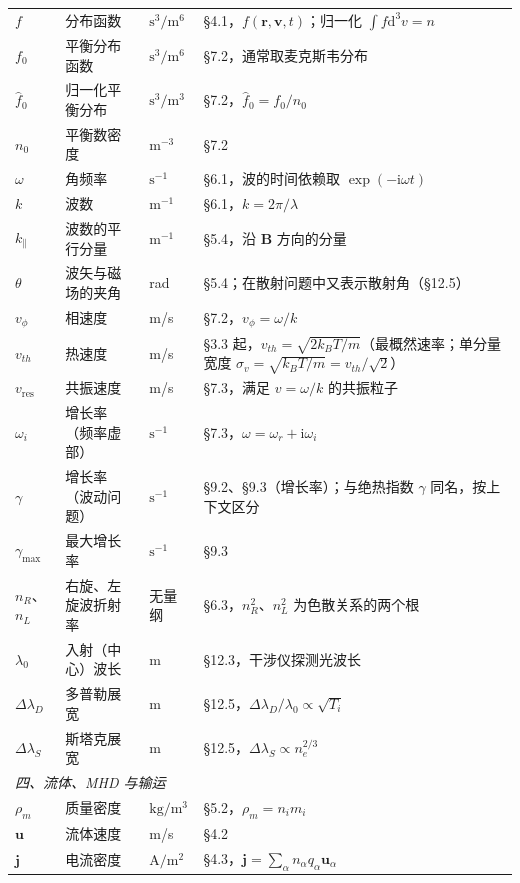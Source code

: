 \documentclass[12pt,a4paper,openany,oneside]{book}
\newcommand{\diff}{\mathrm{d}}
\newcommand{\vect}[1]{\bm{#1}}
\begin{document}
{\begin{longtable}{@{}p{1.8cm}p{4.4cm}p{3.3cm}p{5.1cm}@{}}
\midrule
$f$ & 分布函数 & $\mathrm{s^3/m^6}$ & \S 4.1，$f(\vect{r},\vect{v},t)$；归一化 $\int f\diff^3v = n$ \\
$f_0$ & 平衡分布函数 & $\mathrm{s^3/m^6}$ & \S 7.2，通常取麦克斯韦分布 \\
$\hat f_0$ & 归一化平衡分布 & $\mathrm{s^3/m^3}$ & \S 7.2，$\hat f_0 = f_0/n_0$ \\
$n_0$ & 平衡数密度 & $\mathrm{m^{-3}}$ & \S 7.2 \\
$\omega$ & 角频率 & $\mathrm{s^{-1}}$ & \S 6.1，波的时间依赖取 $\exp(-\mathrm{i}\omega t)$ \\
$k$ & 波数 & $\mathrm{m^{-1}}$ & \S 6.1，$k = 2\pi/\lambda$ \\
$k_\parallel$ & 波数的平行分量 & $\mathrm{m^{-1}}$ & \S 5.4，沿 $\vect{B}$ 方向的分量 \\
$\theta$ & 波矢与磁场的夹角 & rad & \S 5.4；在散射问题中又表示散射角（\S 12.5） \\
$v_\phi$ & 相速度 & m/s & \S 7.2，$v_\phi = \omega/k$ \\
$v_{th}$ & 热速度 & m/s & \S 3.3 起，$v_{th} = \sqrt{2k_{B}T/m}$（最概然速率；单分量宽度 $\sigma_{v}=\sqrt{k_BT/m}=v_{th}/\sqrt2$） \\
$v_{\text{res}}$ & 共振速度 & m/s & \S 7.3，满足 $v = \omega/k$ 的共振粒子 \\
$\omega_i$ & 增长率（频率虚部） & $\mathrm{s^{-1}}$ & \S 7.3，$\omega = \omega_r + \mathrm{i}\omega_i$ \\
$\gamma$ & 增长率（波动问题） & $\mathrm{s^{-1}}$ & \S 9.2、\S 9.3（增长率）；与绝热指数 $\gamma$ 同名，按上下文区分 \\
$\gamma_{\max}$ & 最大增长率 & $\mathrm{s^{-1}}$ & \S 9.3 \\
$n_R$、$n_L$ & 右旋、左旋波折射率 & 无量纲 & \S 6.3，$n_R^2$、$n_L^2$ 为色散关系的两个根 \\
$\lambda_0$ & 入射（中心）波长 & m & \S 12.3，干涉仪探测光波长 \\
$\Delta\lambda_D$ & 多普勒展宽 & m & \S 12.5，$\Delta\lambda_D/\lambda_0 \propto \sqrt{T_i}$ \\
$\Delta\lambda_S$ & 斯塔克展宽 & m & \S 12.5，$\Delta\lambda_S \propto n_e^{2/3}$ \\
\multicolumn{4}{l}{\textit{四、流体、MHD 与输运}} \\
\midrule
$\rho_m$ & 质量密度 & $\mathrm{kg/m^3}$ & \S 5.2，$\rho_m = n_im_i$ \\
$\vect{u}$ & 流体速度 & m/s & \S 4.2 \\
$\vect{j}$ & 电流密度 & $\mathrm{A/m^2}$ & \S 4.3，$\vect{j} = \sum_\alpha n_\alpha q_\alpha\vect{u}_\alpha$ \\

\end{longtable}}
\end{document}
